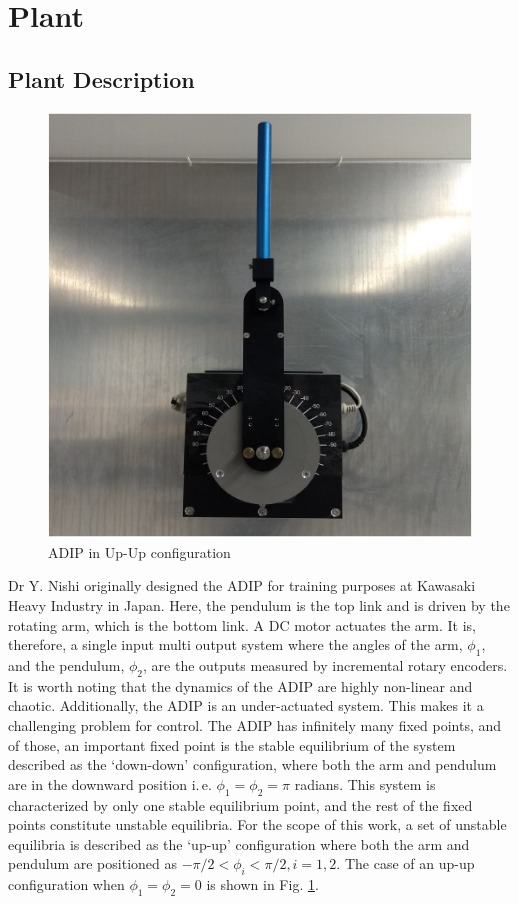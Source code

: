 \section{Plant}
\label{Chapter:Plant}
\subsection{Plant Description}
\begin{figure}[hbt]
    \centering
    \includegraphics{figures/ADIP_plant.png}
    \caption{ADIP in Up-Up configuration}
    \label{fig:ADIP}
\end{figure}
Dr Y. Nishi originally designed the ADIP for training purposes at Kawasaki Heavy Industry in Japan. Here, the pendulum is the top link and is driven by the rotating arm, which is the bottom link. A DC motor actuates the arm. It is, therefore, a single input multi output system where the angles of the arm, $\phi_1$, and the pendulum, $\phi_2$, are the outputs measured by incremental rotary encoders. It is worth noting that the dynamics of the ADIP are highly non-linear and chaotic. Additionally, the ADIP is an under-actuated system. This makes it a challenging problem for control. The ADIP has infinitely many fixed points, and of those, an important fixed point is the stable equilibrium of the system described as the `down-down' configuration, where both the arm and pendulum are in the downward position i.\,e. $\phi_1 = \phi_2 = \pi$ radians. This system is characterized by only one stable equilibrium point, and the rest of the fixed points constitute unstable equilibria. For the scope of this work, a set of unstable equilibria is described as the `up-up' configuration where both the arm and pendulum are positioned as $-\pi/2<\phi_i<\pi/2, i = 1,2$. The case of an up-up configuration when $\phi_1 = \phi_2 = 0$ is shown in Fig. \ref{fig:ADIP}.\\
